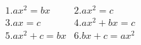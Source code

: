 \documentclass[preview]{standalone}
\begin{document}
\begin{align*}
1. ax^2 = bx    &    2. ax^2 = c \\ 3. ax = c    &   4. ax^2+bx = c \\ 5. ax^2+c = bx  &   6. bx+c = ax^2
\end{align*}
\end{document}
